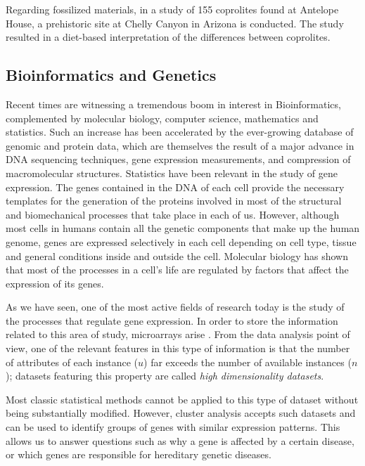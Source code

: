 Regarding fossilized materials, in \cite{sutton1995cluster} a study of 155 coprolites found at Antelope House, a prehistoric site at Chelly Canyon in Arizona is conducted. The study resulted in a diet-based interpretation of the differences between coprolites.

\subsection{Bioinformatics and Genetics}

Recent times are witnessing a tremendous boom in interest in Bioinformatics, complemented by molecular biology, computer science, mathematics and statistics. Such an increase has been accelerated by the ever-growing database of genomic and protein data, which are themselves the result of a major advance in DNA sequencing techniques, gene expression measurements, and compression of macromolecular structures. Statistics have been relevant in the study of gene expression. The genes contained in the DNA of each cell provide the necessary templates for the generation of the proteins involved in most of the structural and biomechanical processes that take place in each of us. However, although most cells in humans contain all the genetic components that make up the human genome, genes are expressed selectively in each cell depending on cell type, tissue and general conditions inside and outside the cell. Molecular biology has shown that most of the processes in a cell's life are regulated by factors that affect the expression of its genes.

As we have seen, one of the most active fields of research today is the study of the processes that regulate gene expression. In order to store the information related to this area of study, microarrays arise \cite{cortese2000array}. From the data analysis point of view, one of the relevant features in this type of information is that the number of attributes of each instance ($u$) far exceeds the number of available instances ($n$); datasets featuring this property are called \textit{high dimensionality datasets}.

Most classic statistical methods cannot be applied to this type of dataset without being substantially modified. However, cluster analysis accepts such datasets and can be used to identify groups of genes with similar expression patterns. This allows us to answer questions such as why a gene is affected by a certain disease, or which genes are responsible for hereditary genetic diseases.

